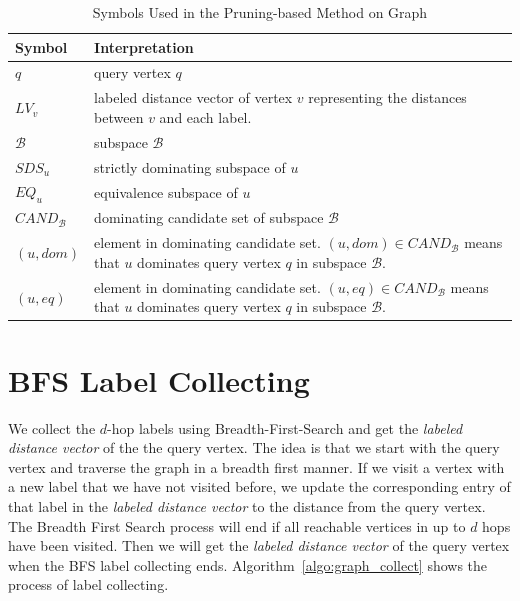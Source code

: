 \begin{table}[h]
\centering
\begin{tabular}{|l|p{11cm}|}
\hline
Symbol                      & Interpretation                                                                                                                                     \\ \hline
$q$                         & query vertex $q$                                                                                                                                   \\ \hline
$LV_v$                      & labeled distance vector of vertex $v$ representing the distances between $v$ and each label.                                                         \\ \hline
$\mathcal{B}$               & subspace $\mathcal{B}$                                                                                                                             \\ \hline
$\mathit{SDS}_u$            & strictly dominating subspace of $u$                                                                                                                \\ \hline
$\mathit{EQ}_u$             & equivalence subspace of $u$                                                                                                                        \\ \hline
$\mathit{CAND}_\mathcal{B}$ & dominating candidate set of subspace $\mathcal{B}$                                                                                                 \\ \hline
$(u, dom)$                  & element in dominating candidate set. $(u, dom) \in \mathit{CAND}_\mathcal{B}$ means that $u$ dominates query vertex $q$ in subspace $\mathcal{B}$. \\ \hline
$(u, eq)$                   & element in dominating candidate set. $(u, eq) \in \mathit{CAND}_\mathcal{B}$ means that $u$ dominates query vertex $q$ in subspace $\mathcal{B}$.  \\ \hline
\end{tabular}
    \caption{Symbols Used in the Pruning-based Method on Graph}
    \label{tab:symbol_graph}
\end{table}

\section{BFS Label Collecting}
\label{sec:bfs-collect}
We collect the $d$-hop labels using Breadth-First-Search and get the \emph{labeled distance vector} of the the query vertex. The idea is that we start with the query vertex and traverse the graph in a breadth first manner. If we visit a vertex with a new label that we have not visited before, we update the corresponding entry of that label in the \emph{labeled distance vector} to the distance from the query vertex. The Breadth First Search process will end if all reachable vertices in up to $d$ hops have been visited. Then we will get the \emph{labeled distance vector} of the query vertex when the BFS label collecting ends. Algorithm~\ref{algo:graph_collect} shows the process of label collecting.


